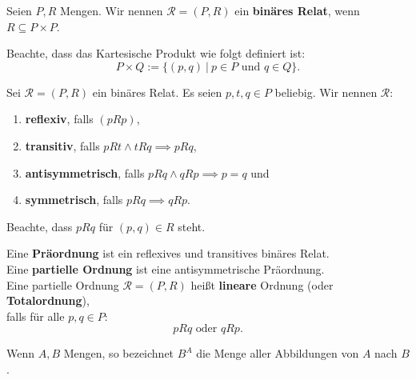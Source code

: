 
\renewcommand{\|}{~|~}
\begin{definition}
    Seien $P,R$ Mengen. Wir nennen $\mathscr{R} = (P,R)$ ein \textbf{binäres Relat}, 
    wenn $R \subseteq P \times P$.

    Beachte, dass das Kartesische Produkt wie folgt definiert ist:
    $$ P \times Q := \{(p,q) \| p \in P \textrm{ und } q \in Q\}.$$
\end{definition}

\begin{definition}
    Sei $\mathscr{R} = (P,R)$ ein binäres Relat. Es seien $p,t,q \in P$ beliebig.
    Wir nennen $\mathscr{R}$:
    \begin{enumerate}[label=(\arabic*)]
        \item \textbf{reflexiv}, falls $(pRp)$,
        \item \textbf{transitiv}, falls $pRt \land tRq \implies pRq$,
        \item \textbf{antisymmetrisch}, falls $pRq \land qRp \implies p=q$ und
        \item \textbf{symmetrisch}, falls $pRq \implies qRp$.
    \end{enumerate}

    Beachte, dass $pRq$ für $(p,q) \in R$ steht.
\end{definition}

\begin{definition}
    Eine \textbf{Präordnung} ist ein reflexives und transitives binäres Relat. \\
    Eine \textbf{partielle Ordnung} ist eine antisymmetrische Präordnung. \\
    Eine partielle Ordnung $\mathscr{R} = (P,R)$ heißt \textbf{lineare} Ordnung (oder \textbf{Totalordnung}),\\
    falls für alle $p,q \in P$: $$pRq \textrm{ oder } qRp.$$
\end{definition}

\begin{notation}
    Wenn $A,B$ Mengen, so bezeichnet $B^A$ die Menge aller Abbildungen von $A$ nach $B$.
\end{notation}

